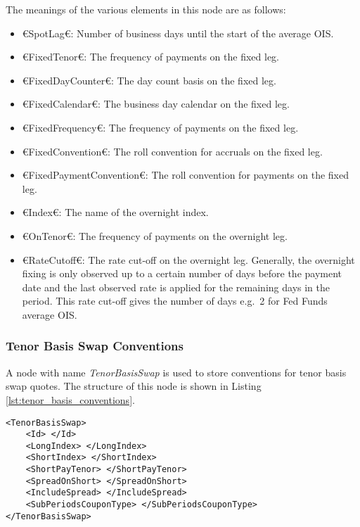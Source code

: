 The meanings of the various elements in this node are as follows:
\begin{itemize}
\item €SpotLag€: Number of business days until the start of the average OIS.
\item €FixedTenor€: The frequency of payments on the fixed leg.
\item €FixedDayCounter€: The day count basis on the fixed leg.
\item €FixedCalendar€: The business day calendar on the fixed leg.
\item €FixedFrequency€: The frequency of payments on the fixed leg.
\item €FixedConvention€: The roll convention for accruals on the fixed leg.
\item €FixedPaymentConvention€: The roll convention for payments on the fixed leg.
\item €Index€: The name of the overnight index.
\item €OnTenor€: The frequency of payments on the overnight leg.
\item €RateCutoff€: The rate cut-off on the overnight leg. Generally, the overnight fixing is only observed up to a certain 
number of days before the payment date and the last observed rate is applied for the remaining days in the period. This 
rate cut-off gives the number of days e.g.\ 2 for Fed Funds average OIS.
\end{itemize}

\subsubsection{Tenor Basis Swap Conventions}
A node with name \emph{TenorBasisSwap} is used to store conventions for tenor basis swap quotes. The structure of this 
node is shown in Listing \ref{lst:tenor_basis_conventions}.

\begin{lstlisting}[caption={Tenor basis swap conventions}, label=lst:tenor_basis_conventions]
<TenorBasisSwap>
	<Id> </Id>
	<LongIndex> </LongIndex>
	<ShortIndex> </ShortIndex>
	<ShortPayTenor> </ShortPayTenor>
	<SpreadOnShort> </SpreadOnShort>
	<IncludeSpread> </IncludeSpread>
	<SubPeriodsCouponType> </SubPeriodsCouponType>
</TenorBasisSwap>
\end{lstlisting}

